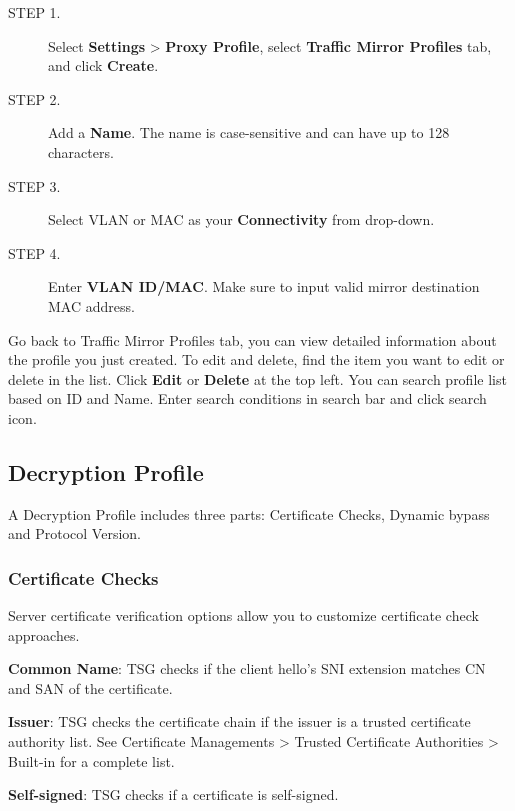 \begin{description}
    \item[STEP 1.]	Select \textbf{Settings} > \textbf{Proxy Profile}, select \textbf{Traffic Mirror Profiles} tab, and click \textbf{Create}.
    \item[STEP 2.]	Add a \textbf{Name}. The name is case-sensitive and can have up to 128 characters.
    \item[STEP 3.]	Select VLAN or MAC as your \textbf{Connectivity} from drop-down.
    \item[STEP 4.]	Enter \textbf{VLAN ID/MAC}. Make sure to input valid mirror destination MAC address. 
\end{description} 
Go back to Traffic Mirror Profiles tab, you can view detailed information about the profile you just created. 
To edit and delete, find the item you want to edit or delete in the list. Click \textbf{Edit} or \textbf{Delete} at the top left. 
You can search profile list based on ID and Name. Enter search conditions in search bar and click search icon.

\subsection*{\hypertarget{link:Decryption Profile}{Decryption Profile}}
\label{sec:decrypt:profile:decryptionprofile}

A Decryption Profile includes three parts: Certificate Checks, Dynamic bypass and Protocol Version. 

\subsubsection*{\hypertarget{link:Certificate Checks}{Certificate Checks}}
\label{sec:decrypt:profile:decryptionprofile:check}

Server certificate verification options allow you to customize certificate check approaches.


\textbf{Common Name}: TSG checks if the client hello’s SNI extension matches CN and SAN of the certificate.


\textbf{Issuer}: TSG checks the certificate chain if the issuer is a trusted certificate authority list. See Certificate Managements > Trusted Certificate Authorities > Built-in for a complete list.


\textbf{Self-signed}: TSG checks if a certificate is self-signed.


